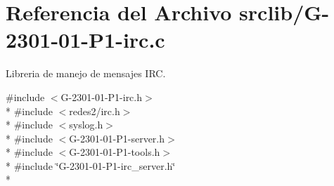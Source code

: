 \hypertarget{G-2301-01-P1-irc_8c}{}\section{Referencia del Archivo srclib/\+G-\/2301-\/01-\/\+P1-\/irc.c}
\label{G-2301-01-P1-irc_8c}


Libreria de manejo de mensajes I\+R\+C.  


{\ttfamily \#include $<$G-\/2301-\/01-\/\+P1-\/irc.\+h$>$}\\*
{\ttfamily \#include $<$redes2/irc.\+h$>$}\\*
{\ttfamily \#include $<$syslog.\+h$>$}\\*
{\ttfamily \#include $<$G-\/2301-\/01-\/\+P1-\/server.\+h$>$}\\*
{\ttfamily \#include $<$G-\/2301-\/01-\/\+P1-\/tools.\+h$>$}\\*
{\ttfamily \#include \char`\"{}G-\/2301-\/01-\/\+P1-\/irc\+\_\+server.\+h\char`\"{}}\\*
